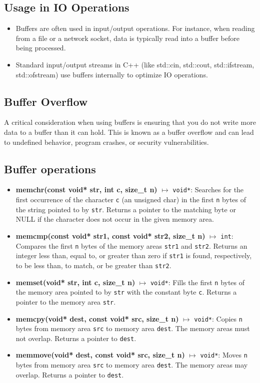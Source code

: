 \documentclass{report}
\begin{document}
    \pagebreak 
    \subsection{Usage in IO Operations}
    \bigbreak \noindent 
    \begin{itemize}
        \item Buffers are often used in input/output operations. For instance, when reading from a file or a network socket, data is typically read into a buffer before being processed.
        \item Standard input/output streams in C++ (like std::cin, std::cout, std::ifstream, std::ofstream) use buffers internally to optimize IO operations.
    \end{itemize}

    \bigbreak \noindent 
    \subsection{Buffer Overflow}
    \bigbreak \noindent 
    A critical consideration when using buffers is ensuring that you do not write more data to a buffer than it can hold. This is known as a buffer overflow and can lead to undefined behavior, program crashes, or security vulnerabilities.

    \bigbreak \noindent 
    \subsection{Buffer operations}
    \begin{itemize}
     \item \textbf{memchr(const void* str, int c, size\_t n)} $\mapsto$ \texttt{void*}: Searches for the first occurrence of the character \texttt{c} (an unsigned char) in the first \texttt{n} bytes of the string pointed to by \texttt{str}. Returns a pointer to the matching byte or NULL if the character does not occur in the given memory area.
        \item \textbf{memcmp(const void* str1, const void* str2, size\_t n)} $\mapsto$ \texttt{int}: Compares the first \texttt{n} bytes of the memory areas \texttt{str1} and \texttt{str2}. Returns an integer less than, equal to, or greater than zero if \texttt{str1} is found, respectively, to be less than, to match, or be greater than \texttt{str2}.
        \item \textbf{memset(void* str, int c, size\_t n)} $\mapsto$ \texttt{void*}: Fills the first \texttt{n} bytes of the memory area pointed to by \texttt{str} with the constant byte \texttt{c}. Returns a pointer to the memory area \texttt{str}.
        \item \textbf{memcpy(void* dest, const void* src, size\_t n)} $\mapsto$ \texttt{void*}: Copies \texttt{n} bytes from memory area \texttt{src} to memory area \texttt{dest}. The memory areas must not overlap. Returns a pointer to \texttt{dest}.
        \item \textbf{memmove(void* dest, const void* src, size\_t n)} $\mapsto$ \texttt{void*}: Moves \texttt{n} bytes from memory area \texttt{src} to memory area \texttt{dest}. The memory areas may overlap. Returns a pointer to \texttt{dest}.
    \end{itemize}
\end{document}
